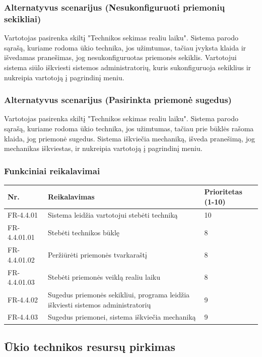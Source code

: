 \documentclass[oneside]{VUMIFPSkursinis}
\begin{document}
\subsubsection{Alternatyvus scenarijus (Nesukonfiguruoti priemonių sekikliai)}
	Vartotojas pasirenka skiltį "Technikos sekimas realiu laiku". Sistema parodo sąrašą, kuriame rodoma ūkio technika, jos užimtumas, tačiau įvyksta klaida ir išvedamas pranešimas, jog nesukonfiguruotas priemonės sekiklis. Vartotojui sistema siūlo iškviesti sistemos administratorių, kuris sukonfiguruoja sekiklius ir nukreipia vartotoją į pagrindinį meniu.
\subsubsection{Alternatyvus scenarijus (Pasirinkta priemonė sugedus)}
	Vartotojas pasirenka skiltį "Technikos sekimas realiu laiku". Sistema parodo sąrašą, kuriame rodoma ūkio technika, jos užimtumas, tačiau prie būklės rašoma klaida, jog priemonė sugedus. Sistema iškviečia mechaniką, išveda pranešimą, jog mechanikas iškviestas, ir nukreipia vartotoją į pagrindinį meniu.
\subsubsection{Funkciniai reikalavimai}
\begin{table}[htbp]
	\begin{tabularx}{1\textwidth}{ |P{2.5cm}|X|P{3cm }| }  \hline
           	Nr. & Reikalavimas &  Prioritetas (1-10)  \\   \hline 
         	FR-4.4.01 & Sistema leidžia vartotojui stebėti techniką & 10  \\   \hline
		FR-4.4.01.01 & Stebėti technikos būklę & 8 \\ \hline
		FR-4.4.01.02 & Peržiūrėti priemonės tvarkaraštį & 8 \\ \hline
		FR-4.4.01.03 & Stebėti priemonės veiklą realiu laiku & 8 \\ \hline
        	FR-4.4.02 & Sugedus priemonės sekikliui, programa leidžia iškviesti sistemos administratorių & 9   \\   \hline
		FR-4.4.03 & Sugedus priemonei, sistema iškviečia mechaniką & 9 \\ \hline
	\end{tabularx}
\end{table}

\subsection{Ūkio technikos resursų pirkimas}
\end{document}
